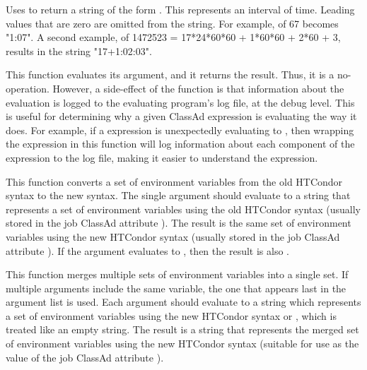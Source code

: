 \begin{description}
  \item[\Code{String interval(Integer seconds)}]
    Uses  to return a string of the form
    .
    This represents an interval of time.
    Leading values that are zero are omitted from the string.
    For example,  of 67 becomes "1:07".
    A second example,  of 
    1472523 = 17*24*60*60 + 1*60*60 + 2*60 + 3, results in the
    string "17+1:02:03".

  \item[\Code{AnyType debug(AnyType expression)}]
     This function evaluates its argument, and it returns the result.
     Thus, it is a no-operation.
     However, a side-effect of the function is that information about
     the evaluation is logged to the evaluating program's log file,
     at the  debug level.
     This is useful for determining why a given ClassAd expression
     is evaluating the way it does.  
     For example, if a   expression
     is unexpectedly evaluating to ,
     then wrapping the expression in this  function will
     log information about each component of the expression to the log file,
     making it easier to understand the expression.

  \item[\Code{String envV1ToV2(String old\_env)}]
    This function converts a set of environment variables from the old
    HTCondor syntax to the new syntax.
    The single argument should evaluate to a string that represents a
    set of environment variables using the old HTCondor syntax
    (usually stored in the job ClassAd attribute ).
    The result is the same set of environment variables using the new
    HTCondor syntax (usually stored in the job ClassAd attribute
    ).
    If the argument evaluates to , then the result is
    also .

  \item[\Code{String mergeEnvironment(String env1 [ , String env2, ... ])}]
    This function merges multiple sets of environment variables into
    a single set.
    If multiple arguments include the same variable, the one that appears
    last in the argument list is used.
    Each argument should evaluate to a string which represents a set of
    environment variables using the new HTCondor syntax or ,
    which is treated like an empty string.
    The result is a string that represents the merged set of environment
    variables using the new HTCondor syntax (suitable for use as the value
    of the job ClassAd attribute ).

\end{description}


